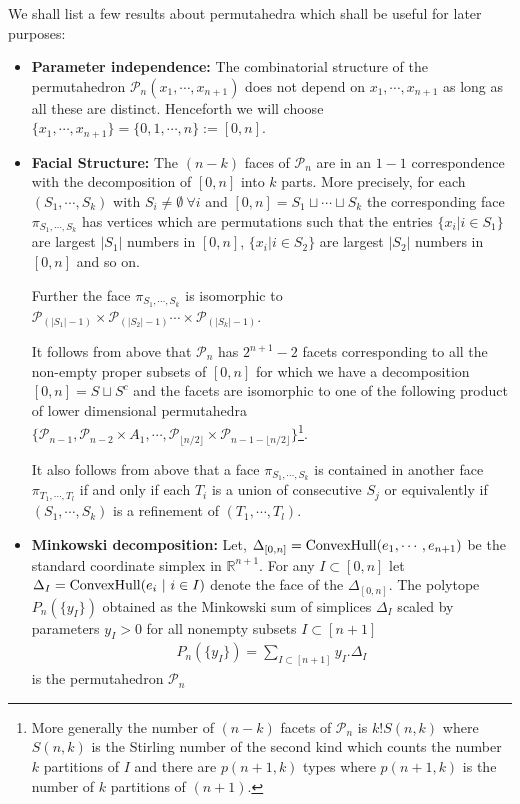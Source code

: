 \documentclass[hidelinks,12pt]{article}
\newcommand{\bea}[1]{\begin{eqnarray}\label{#1} }
\newcommand{\eea}{\end{eqnarray}}
\def\bea{\begin{eqnarray}}
\def\eea{\end{eqnarray}}
\begin{document}
We shall list a few results about permutahedra which shall be useful for later purposes: 
\begin{itemize}
\item {\bf Parameter independence:} The combinatorial structure of the permutahedron ${\mathscr P_n} (x_1, \cdots, x_{n+1}) $ does not depend on $ x_1, \cdots, x_{n+1} $ as long as all these are distinct. Henceforth  we will choose $ \{x_1, \cdots, x_{n+1}\} = \{0,1,\cdots,n \} := [0,n ]$. \\
\item {\bf Facial Structure:} The $(n-k)$ faces of ${\mathscr P_n}$ are in an $1-1$ correspondence with the decomposition of $[0,n]$ into $k$ parts. More precisely, for each $(S_1,\cdots,S_k)$ with $S_i \neq \emptyset ~ \forall i$ and $[0,n] = S_1 \sqcup \cdots \sqcup S_k$ the corresponding face $\pi_{S_1,\cdots,S_k}$ has vertices which are permutations such that the entries $ \{x_i | i \in S_1 \}$ are largest $|S_1|$ numbers in $[0,n]$, $\{x_i | i \in S_2 \}$ are largest $|S_2|$ numbers in $[0,n]$ and so on. 

Further the face $\pi_{S_1,\cdots,S_k}$   is isomorphic to ${\mathscr P_{\left(| S_1|-1\right)} }\times {\mathscr P_{\left(| S_2|-1\right)} } \cdots \times{\mathscr P_{\left(| S_k|-1\right)} } $.

It follows from above that ${\mathscr P_n}$ has $2^{n+1} -2$ facets corresponding to all the non-empty proper subsets of $[0,n]$ for which we have a decomposition $[0,n] = S \sqcup S^c$ and the facets are isomorphic to one of the following product of lower dimensional permutahedra  $ \{ {\mathscr P_{n-1}}, {\mathscr P_{n-2}} \times A_1, \cdots ,{\mathscr P_{\lfloor{n/2 \rfloor}}} \times {\mathscr P_{n-1-\lfloor n/2 \rfloor}}  \} $\footnote {More generally the number of $(n-k)$ facets of ${\mathscr P_n}$ is $ k! S(n,k)$ where $S(n,k)$ is the Stirling number of the second kind which counts the number $k$ partitions of  $I$ and there are $p(n+1,k)$ types where $p(n+1,k)$ is the number of $k$ partitions of $(n+1)$.}.


It also follows from above that a face $\pi_{S_1,\cdots,S_k}$ is contained in another face $\pi_{T_1,\cdots,T_l}$ if and only if each $T_i$ is a union of consecutive $S_j$ or equivalently if $(S_1,\cdots,S_k)$ is a refinement of $(T_1,\cdots,T_l)$.
\item {\bf Minkowski decomposition:}   Let, $\Delta_{[0,n]} = {\rm ConvexHull}(e_1,\cdots,e_{n+1})$ be the standard coordinate simplex in $\mathbb{R}^{n+1}$. For any $I \subset [0,n] $ let $\Delta_I ={\rm ConvexHull}(e_i~|~i\in I)$ denote the face of the $\Delta_{[0,n]}$. The polytope $P_n(\{y_I \})$ obtained as the Minkowski sum of simplices $\Delta_I$ scaled by  parameters $y_I > 0$ for all nonempty subsets $I \subset [n+1]$
 \bea
 P_n(\{y_I \})= \sum_{I \subset[n+1]} y_I . \Delta_I  \nonumber
 \eea
 is the permutahedron ${\mathscr P_n}$
\end{itemize}
\end{document}
